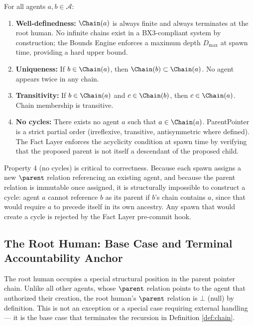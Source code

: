 \begin{property}
\label{prop:chain_properties}
For all agents $a, b \in \mathcal{A}$:
\begin{enumerate}
    \item \textbf{Well-definedness:} $\Chain(a)$ is always finite and always terminates at the root human. No infinite chains exist in a BX3-compliant system by construction; the Bounds Engine enforces a maximum depth $D_{\max}$ at spawn time, providing a hard upper bound.

    \item \textbf{Uniqueness:} If $b \in \Chain(a)$, then $\Chain(b) \subset \Chain(a)$. No agent appears twice in any chain.

    \item \textbf{Transitivity:} If $b \in \Chain(a)$ and $c \in \Chain(b)$, then $c \in \Chain(a)$. Chain membership is transitive.

    \item \textbf{No cycles:} There exists no agent $a$ such that $a \in \Chain(a)$. ParentPointer is a strict partial order (irreflexive, transitive, antisymmetric where defined). The Fact Layer enforces the acyclicity condition at spawn time by verifying that the proposed parent is not itself a descendant of the proposed child.
\end{enumerate}
\end{property}

Property 4 (no cycles) is critical to correctness. Because each spawn assigns a new $\parent$ relation referencing an existing agent, and because the parent relation is immutable once assigned, it is structurally impossible to construct a cycle: agent $a$ cannot reference $b$ as its parent if $b$'s chain contains $a$, since that would require $a$ to precede itself in its own ancestry. Any spawn that would create a cycle is rejected by the Fact Layer pre-commit hook.

\subsection{The Root Human: Base Case and Terminal Accountability Anchor}
\label{sec:root_human}

The root human occupies a special structural position in the parent pointer chain. Unlike all other agents, whose $\parent$ relation points to the agent that authorized their creation, the root human's $\parent$ relation is $\bot$ (null) by definition. This is not an exception or a special case requiring external handling — it is the base case that terminates the recursion in Definition \ref{def:chain}.

